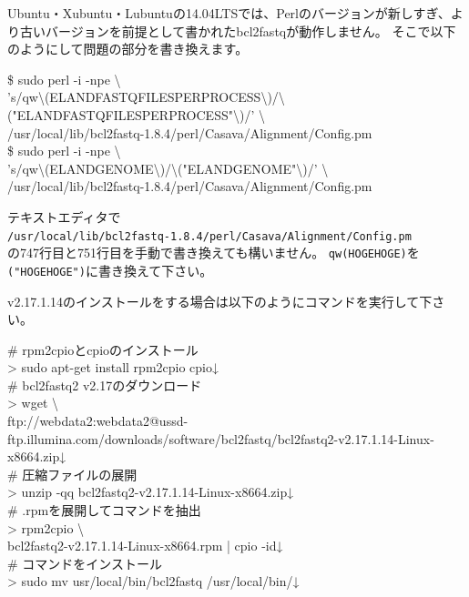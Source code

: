 \documentclass[titlepage,10pt,a4paper,english]{jsbook}
\newenvironment{cmd}{\begin{oframed}\raggedright\ttfamily\footnotesize\setlength{\baselineskip}{1.4em}}{\end{oframed}\vspace{-1em}}
\begin{document}
Ubuntu・Xubuntu・Lubuntuの14.04LTSでは、Perlのバージョンが新しすぎ、より古いバージョンを前提として書かれたbcl2fastqが動作しません。
そこで以下のようにして問題の部分を書き換えます。
\begin{cmd}
\$ sudo perl -i -npe {\textbackslash}\\
's/qw{\textbackslash}(ELAND{\textunderscore}FASTQ{\textunderscore}FILES{\textunderscore}PER{\textunderscore}PROCESS{\textbackslash})/{\textbackslash}("ELAND{\textunderscore}FASTQ{\textunderscore}FILES{\textunderscore}PER{\textunderscore}PROCESS"{\textbackslash})/' {\textbackslash}\\
/usr/local/lib/bcl2fastq-1.8.4/perl/Casava/Alignment/Config.pm\\
\$ sudo perl -i -npe {\textbackslash}\\
's/qw{\textbackslash}(ELAND{\textunderscore}GENOME{\textbackslash})/{\textbackslash}("ELAND{\textunderscore}GENOME"{\textbackslash})/' {\textbackslash}\\
/usr/local/lib/bcl2fastq-1.8.4/perl/Casava/Alignment/Config.pm
\end{cmd}
テキストエディタで\\
\texttt{/usr/local/lib/bcl2fastq-1.8.4/perl/Casava/Alignment/Config.pm}\\
の747行目と751行目を手動で書き換えても構いません。
\texttt{qw(HOGEHOGE)}を\texttt{("HOGEHOGE")}に書き換えて下さい。

v2.17.1.14のインストールをする場合は以下のようにコマンドを実行して下さい。
\begin{cmd}
\# rpm2cpioとcpioのインストール\\
{\textgreater} sudo apt-get install rpm2cpio cpio↓\\
\# bcl2fastq2 v2.17のダウンロード\\
{\textgreater} wget {\textbackslash}\\
ftp://webdata2:webdata2@ussd-ftp.illumina.com/downloads/software/bcl2fastq/bcl2fastq2-v2.17.1.14-Linux-x86{\textunderscore}64.zip↓\\
\# 圧縮ファイルの展開\\
{\textgreater} unzip -qq bcl2fastq2-v2.17.1.14-Linux-x86{\textunderscore}64.zip↓\\
\# .rpmを展開してコマンドを抽出\\
{\textgreater} rpm2cpio {\textbackslash}\\
bcl2fastq2-v2.17.1.14-Linux-x86{\textunderscore}64.rpm | cpio -id↓\\
\# コマンドをインストール\\
{\textgreater} sudo mv usr/local/bin/bcl2fastq /usr/local/bin/↓
\end{cmd}
\end{document}
